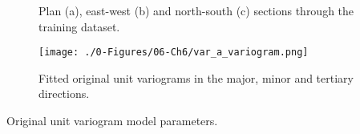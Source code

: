 


\begin{figure}
    \centering
    \tabskip=0pt
    \caption{Plan (a), east-west (b) and north-south (c) sections through the training dataset.}
    \label{fig:train_data}
\end{figure}

\begin{figure}[htb!]
    \centering
    \texttt{[image: ./0-Figures/06-Ch6/var\_a\_variogram.png]}
    \caption{Fitted original unit variograms in the major, minor and tertiary directions. }
    \label{fig:orig_expvar}
\end{figure}

\begin{table}[!htb]
    \centering
    \caption{Original unit variogram model parameters.}
    \resizebox{1\width}{!}{}
    \label{tab:orig_expvar}
\end{table}


